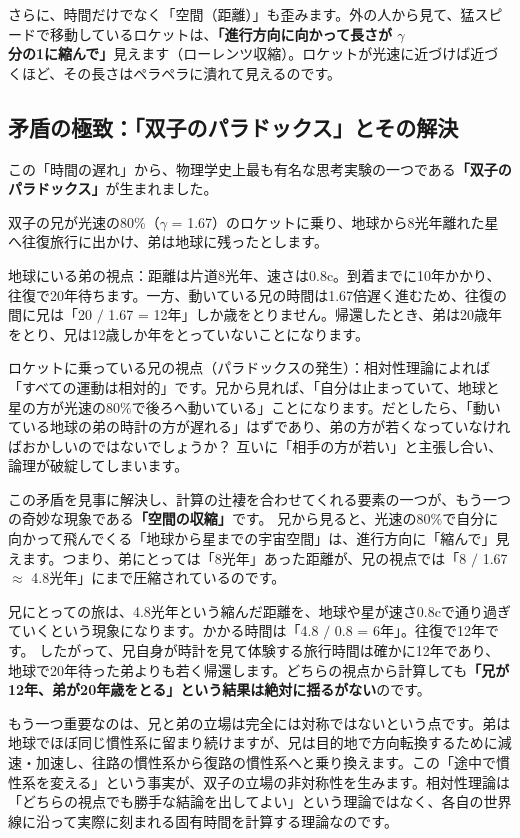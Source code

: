 さらに、時間だけでなく「空間（距離）」も歪みます。外の人から見て、猛スピードで移動しているロケットは、\textbf{「進行方向に向かって長さが \ensuremath{\gamma} 分の1に縮んで」}見えます（ローレンツ収縮）。ロケットが光速に近づけば近づくほど、その長さはペラペラに潰れて見えるのです。

\subsection{矛盾の極致：「双子のパラドックス」とその解決}

この「時間の遅れ」から、物理学史上最も有名な思考実験の一つである\textbf{「双子のパラドックス」}が生まれました。

双子の兄が光速の80\%（\ensuremath{\gamma} = 1.67）のロケットに乗り、地球から8光年離れた星へ往復旅行に出かけ、弟は地球に残ったとします。

地球にいる弟の視点：距離は片道8光年、速さは0.8c。到着までに10年かかり、往復で20年待ちます。一方、動いている兄の時間は1.67倍遅く進むため、往復の間に兄は「20 \ensuremath{\mathbin{/}} 1.67 = 12年」しか歳をとりません。帰還したとき、弟は20歳年をとり、兄は12歳しか年をとっていないことになります。

ロケットに乗っている兄の視点（パラドックスの発生）：相対性理論によれば「すべての運動は相対的」です。兄から見れば、「自分は止まっていて、地球と星の方が光速の80\%で後ろへ動いている」ことになります。だとしたら、「動いている地球の弟の時計の方が遅れる」はずであり、弟の方が若くなっていなければおかしいのではないでしょうか？ 互いに「相手の方が若い」と主張し合い、論理が破綻してしまいます。

この矛盾を見事に解決し、計算の辻褄を合わせてくれる要素の一つが、もう一つの奇妙な現象である\textbf{「空間の収縮」}です。 兄から見ると、光速の80\%で自分に向かって飛んでくる「地球から星までの宇宙空間」は、進行方向に「縮んで」見えます。つまり、弟にとっては「8光年」あった距離が、兄の視点では「8 \ensuremath{\mathbin{/}} 1.67 \ensuremath{\approx} 4.8光年」にまで圧縮されているのです。

兄にとっての旅は、4.8光年という縮んだ距離を、地球や星が速さ0.8cで通り過ぎていくという現象になります。かかる時間は「4.8 \ensuremath{\mathbin{/}} 0.8 = 6年」。往復で12年です。 したがって、兄自身が時計を見て体験する旅行時間は確かに12年であり、地球で20年待った弟よりも若く帰還します。どちらの視点から計算しても\textbf{「兄が12年、弟が20年歳をとる」という結果は絶対に揺るがない}のです。

もう一つ重要なのは、兄と弟の立場は完全には対称ではないという点です。弟は地球でほぼ同じ慣性系に留まり続けますが、兄は目的地で方向転換するために減速・加速し、往路の慣性系から復路の慣性系へと乗り換えます。この「途中で慣性系を変える」という事実が、双子の立場の非対称性を生みます。相対性理論は「どちらの視点でも勝手な結論を出してよい」という理論ではなく、各自の世界線に沿って実際に刻まれる固有時間を計算する理論なのです。

